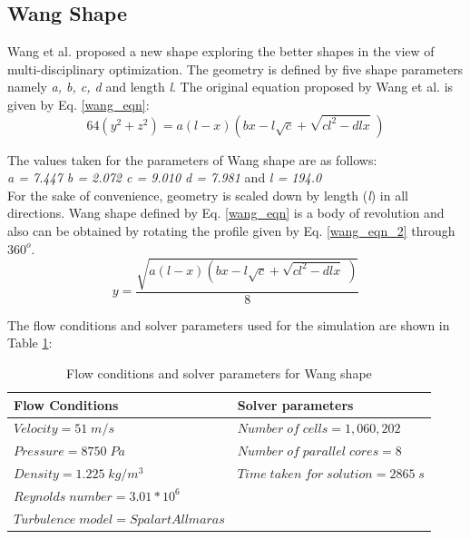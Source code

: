 \subsection{Wang Shape \cite{Wang2009}}
Wang et al. \cite{Wang2009} proposed a new shape exploring the better shapes in the view of multi-disciplinary optimization. The geometry is defined by five shape parameters namely \textit{a, b, c, d} and length \textit{l}. The original equation proposed by Wang et al.\cite{Wang2009} is given by Eq. \ref{wang_eqn}:
\begin{equation}
64(y^{2} + z^{2}) = a(l-x)\left( bx - l \sqrt{c} + \sqrt{c l^{2} - dlx} \; \right) 
\label{wang_eqn}
\end{equation}

The values taken for the parameters of Wang shape are as follows: \\
\quad \textit{a = 7.447  \quad b = 2.072  \quad  c = 9.010 \quad d = 7.981} \quad and \quad \textit{l = 194.0} \\

For the sake of convenience, geometry is scaled down by length (\textit{l}) in all directions.
Wang shape defined by Eq. \ref{wang_eqn} is a body of revolution and also can be obtained by rotating the profile given by Eq. \ref{wang_eqn_2} through $ 360^{o} $.
\begin{equation}
y = \dfrac{\sqrt{a(l-x)\left( bx - l \sqrt{c} + \sqrt{c l^{2} - dlx} \; \right)}}{8} 
\label{wang_eqn_2}
\end{equation}

The flow conditions and solver parameters used for the simulation are shown in Table \ref{Flow conditions and solver parametres for Wang shape}:

\begin{table}[H]
	\caption{Flow conditions and solver parameters for Wang shape}
	\label{Flow conditions and solver parametres for Wang shape}
	\centering
	\begin{tabular}{ll}
		\hline \hline
		Flow Conditions & Solver parameters  \\ \hline \hline
		
		$ Velocity = 51 \; m/s$ & $Number \; of \; cells = 1,060,202$    \\  
		$ Pressure = 8750 \; Pa $ & $ Number \; of \; parallel \; cores = 8 $     \\
		$ Density = 1.225 \; kg/m^{3} $ & $ Time \; taken \; for \; solution = 2865 \; s  $    \\
		$ Reynolds \; number = 3.01 * 10^{6} $ &    \\
		$ Turbulence \; model = Spalart Allmaras $ &     \\
		\hline
	\end{tabular}
\end{table}


